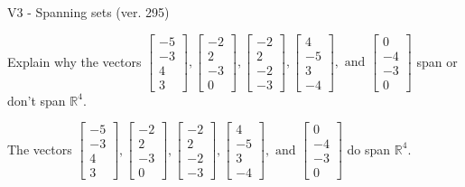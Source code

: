 \begin{exercise}
  \begin{exerciseTitle}V3 - Spanning sets (ver. 295)\end{exerciseTitle}
  \begin{exerciseStatement}
    Explain why the vectors \(\left[\begin{array}{r}
-5 \\
-3 \\
4 \\
3
\end{array}\right] , \left[\begin{array}{r}
-2 \\
2 \\
-3 \\
0
\end{array}\right] , \left[\begin{array}{r}
-2 \\
2 \\
-2 \\
-3
\end{array}\right] , \left[\begin{array}{r}
4 \\
-5 \\
3 \\
-4
\end{array}\right] , \text{ and } \left[\begin{array}{r}
0 \\
-4 \\
-3 \\
0
\end{array}\right]\) span or don't span \(\mathbb{R}^4\). 
	


  \end{exerciseStatement}
  \begin{exerciseAnswer}
   The vectors \(\left[\begin{array}{r}
-5 \\
-3 \\
4 \\
3
\end{array}\right] , \left[\begin{array}{r}
-2 \\
2 \\
-3 \\
0
\end{array}\right] , \left[\begin{array}{r}
-2 \\
2 \\
-2 \\
-3
\end{array}\right] , \left[\begin{array}{r}
4 \\
-5 \\
3 \\
-4
\end{array}\right] , \text{ and } \left[\begin{array}{r}
0 \\
-4 \\
-3 \\
0
\end{array}\right]\) 
  	 do  
	span \(\mathbb{R}^4\).
  



\end{exerciseAnswer}
\end{exercise}
